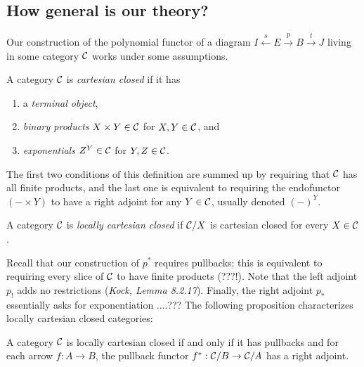 \subsection{How general is our theory?}

Our construction of the polynomial functor of a diagram $I \overset{s}{\leftarrow} E \overset{p}{\rightarrow} B \overset{t}{\rightarrow} J$ living in some category $\mathcal{C}$ works under some assumptions.

\begin{definition}
  A category $\mathcal{C}$ is \emph{cartesian closed} if it has
  \begin{enumerate}[(1)]
    \setlength{\itemsep}{1pt}
    \item a \emph{terminal object},
    \item \emph{binary products} $X\times Y\in\mathcal{C}$ for $X,Y\in\mathcal{C}$, and
    \item \emph{exponentials} $Z^Y\in\mathcal{C}$ for $Y,Z\in\mathcal{C}$.
  \end{enumerate}
\end{definition}

The first two conditions of this definition are summed up by requiring that $\mathcal{C}$ has all finite products, and the last one is equivalent to requiring the endofunctor $(-\times Y)$ to have a right adjoint for any $Y\in\mathcal{C}$, usually denoted $(-)^Y$.

\begin{definition}
  A category $\mathcal{C}$ is \emph{locally cartesian closed} if $\mathcal{C}/X$ is cartesian closed for every $X\in\mathcal{C}$.
\end{definition}

Recall that our construction of $p^*$ requires pullbacks; this is equivalent to requiring every slice of $\mathcal{C}$ to have finite products (???!). Note that the left adjoint $p_!$ adds no restrictions (\emph{Kock, Lemma 8.2.17}). Finally, the right adjoint $p_*$ essentially asks for exponentiation ....??? The following proposition characterizes locally cartesian closed categories:

\begin{theorem}
  A category $\mathcal{C}$ is locally cartesian closed if and only if it has pullbacks and for each arrow $f:A\to B$, the pullback functor $f^*:\mathcal{C}/B\to\mathcal{C}/A$ has a right adjoint.
\end{theorem}

\pagebreak
